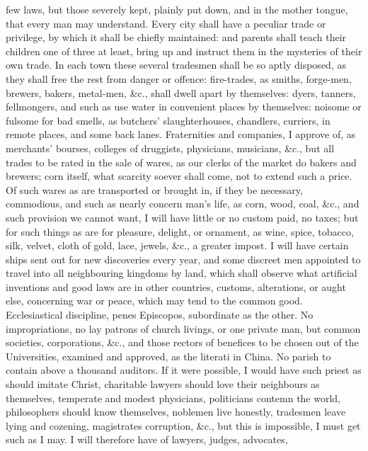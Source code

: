 {few laws, but those severely kept, plainly put down, and in the mother
tongue, that every man may understand. Every city shall have a peculiar
trade or privilege, by which it shall be chiefly maintained: and
parents shall teach their children one of three at least, bring up and
instruct them in the mysteries of their own trade. In each town these
several tradesmen shall be so aptly disposed, as they shall free the
rest from danger or offence: fire-trades, as smiths, forge-men,
brewers, bakers, metal-men, \&c., shall dwell apart by themselves:
dyers, tanners, fellmongers, and such as use water in convenient places
by themselves: noisome or fulsome for bad smells, as butchers'
slaughterhouses, chandlers, curriers, in remote places, and some back
lanes. Fraternities and companies, I approve of, as merchants' bourses,
colleges of druggists, physicians, musicians, \&c., but all trades to be
rated in the sale of wares, as our clerks of the market do bakers and
brewers; corn itself, what scarcity soever shall come, not to extend
such a price. Of such wares as are transported or brought in, if
they be necessary, commodious, and such as nearly concern man's life,
as corn, wood, coal, \&c., and such provision we cannot want, I will
have little or no custom paid, no taxes; but for such things as are for
pleasure, delight, or ornament, as wine, spice, tobacco, silk, velvet,
cloth of gold, lace, jewels, \&c., a greater impost. I will have certain
ships sent out for new discoveries every year, and some discreet
men appointed to travel into all neighbouring kingdoms by land, which
shall observe what artificial inventions and good laws are in other
countries, customs, alterations, or aught else, concerning war or
peace, which may tend to the common good. Ecclesiastical discipline,
penes Episcopos, subordinate as the other. No impropriations, no lay
patrons of church livings, or one private man, but common societies,
corporations, \&c., and those rectors of benefices to be chosen out of
the Universities, examined and approved, as the literati in China. No
parish to contain above a thousand auditors. If it were possible, I
would have such priest as should imitate Christ, charitable lawyers
should love their neighbours as themselves, temperate and modest
physicians, politicians contemn the world, philosophers should know
themselves, noblemen live honestly, tradesmen leave lying and cozening,
magistrates corruption, \&c., but this is impossible, I must get such as
I may. I will therefore have of lawyers, judges, advocates,
}
